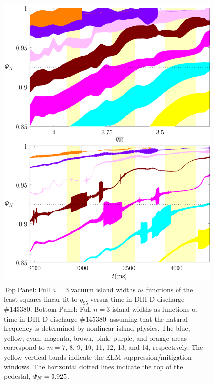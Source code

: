 \documentclass[12pt,prb,aps]{revtex4-1}
\begin{document}
\begin{figure}
\includegraphics[height=6in]{fig6.pdf}
\caption{Top Panel: Full  $n=3$ vacuum island widths as functions of the least-squares linear fit to $q_{95}$ versus time 
in   DIII-D discharge \#145380.
Bottom Panel:  Full $n=3$ island widths as functions of time
in   DIII-D discharge \#145380, assuming that the natural frequency is determined by nonlinear island physics. The blue, yellow, cyan, magenta, brown, pink,
purple, and orange  areas correspond to $m=7$, 8, 9, 10, 11, 12, 13, and 14, respectively. The yellow vertical bands indicate the ELM-suppression/mitigation windows. 
The horizontal dotted lines indicate the top of the pedestal, ${\mit\Psi}_N=0.925$.} \label{fig6}
\end{figure}
\end{document}
